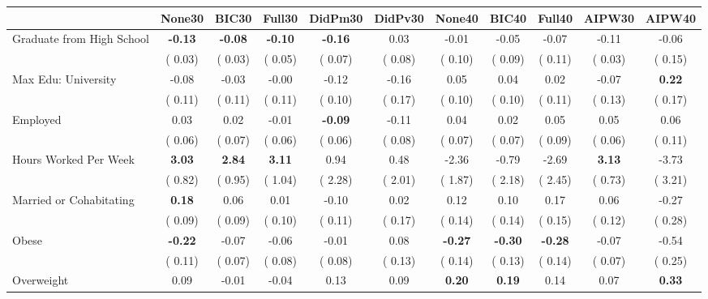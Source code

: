\begin{tabular}{l c c c c c c c c c c}
\toprule
 & None30 & BIC30 & Full30 & DidPm30 & DidPv30 & None40 & BIC40 & Full40 & AIPW30 & AIPW40 \\
\midrule
Graduate from High School & \textbf{     -0.13 } & \textbf{     -0.08 } & \textbf{     -0.10 } & \textbf{     -0.16 } &      0.03 &     -0.01 &     -0.05 &     -0.07 &     -0.11 &     -0.06 \\
& (     0.03) & (     0.03) & (     0.05) & (     0.07) & (     0.08) & (     0.10) & (     0.09) & (     0.11) & (     0.03) & (     0.15) \\
Max Edu: University &     -0.08 &     -0.03 &     -0.00 &     -0.12 &     -0.16 &      0.05 &      0.04 &      0.02 &     -0.07 & \textbf{     0.22} \\
& (     0.11) & (     0.11) & (     0.11) & (     0.10) & (     0.17) & (     0.10) & (     0.10) & (     0.11) & (     0.13) & (     0.17) \\
Employed &      0.03 &      0.02 &     -0.01 & \textbf{     -0.09 } &     -0.11 &      0.04 &      0.02 &      0.05 &      0.05 &      0.06 \\
& (     0.06) & (     0.07) & (     0.06) & (     0.06) & (     0.08) & (     0.07) & (     0.07) & (     0.09) & (     0.06) & (     0.11) \\
Hours Worked Per Week & \textbf{      3.03 } & \textbf{      2.84 } & \textbf{      3.11 } &      0.94 &      0.48 &     -2.36 &     -0.79 &     -2.69 & \textbf{     3.13} &     -3.73 \\
& (     0.82) & (     0.95) & (     1.04) & (     2.28) & (     2.01) & (     1.87) & (     2.18) & (     2.45) & (     0.73) & (     3.21) \\
Married or Cohabitating & \textbf{      0.18 } &      0.06 &      0.01 &     -0.10 &      0.02 &      0.12 &      0.10 &      0.17 &      0.06 &     -0.27 \\
& (     0.09) & (     0.09) & (     0.10) & (     0.11) & (     0.17) & (     0.14) & (     0.14) & (     0.15) & (     0.12) & (     0.28) \\
Obese & \textbf{     -0.22 } &     -0.07 &     -0.06 &     -0.01 &      0.08 & \textbf{     -0.27 } & \textbf{     -0.30 } & \textbf{     -0.28 } &     -0.07 &     -0.54 \\
& (     0.11) & (     0.07) & (     0.08) & (     0.08) & (     0.13) & (     0.14) & (     0.13) & (     0.14) & (     0.07) & (     0.25) \\
Overweight &      0.09 &     -0.01 &     -0.04 &      0.13 &      0.09 & \textbf{      0.20 } & \textbf{      0.19 } &      0.14 &      0.07 & \textbf{     0.33} \\

\end{tabular}
